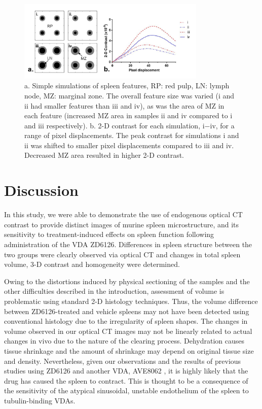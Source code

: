 \documentclass[12pt]{article}
\begin{document}
\begin{figure}%
	\centering
	\includegraphics[width=0.8\textwidth]{Figure6.jpg}
	\caption{a. Simple simulations of spleen features, RP: red pulp, LN: lymph node, MZ: marginal zone. The overall feature size was varied (i and ii had smaller features than iii and iv), as was the area of MZ in each feature (increased MZ area in samples ii and iv compared to i and iii respectively). b. 2-D contrast for each simulation, i−iv, for a range of pixel displacements. The peak contrast for simulations i and ii was shifted to smaller pixel displacements compared to iii and iv. Decreased MZ area resulted in higher 2-D contrast.}
	\label{fig:6}
\end{figure}



\section{Discussion}
In this study, we were able to demonstrate the use of endogenous optical CT contrast to provide distinct images of murine spleen microstructure, and its sensitivity to treatment-induced effects on spleen function following administration of the VDA ZD6126. Differences in spleen structure between the two groups were clearly observed via optical CT and changes in total spleen volume, 3-D contrast and homogeneity were determined.

Owing to the distortions induced by physical sectioning of the samples and the other difficulties described in the introduction, assessment of volume is problematic using standard 2-D histology techniques. Thus, the volume difference between ZD6126-treated and vehicle spleens may not have been detected using conventional histology due to the irregularity of spleen shapes. The changes in volume observed in our optical CT images may not be linearly related to actual changes in vivo due to the nature of the clearing process. Dehydration causes tissue shrinkage and the amount of shrinkage may depend on original tissue size and density. Nevertheless, given our observations and the results of previous studies using ZD6126 and another VDA, AVE8062 \cite{cullistumour2006, guffroyevaluation2004}, it is highly likely that the drug has caused the spleen to contract. This is thought to be a consequence of the sensitivity of the atypical sinusoidal, unstable endothelium of the spleen \cite{groomthe1987} to tubulin-binding VDAs. 
\end{document}
